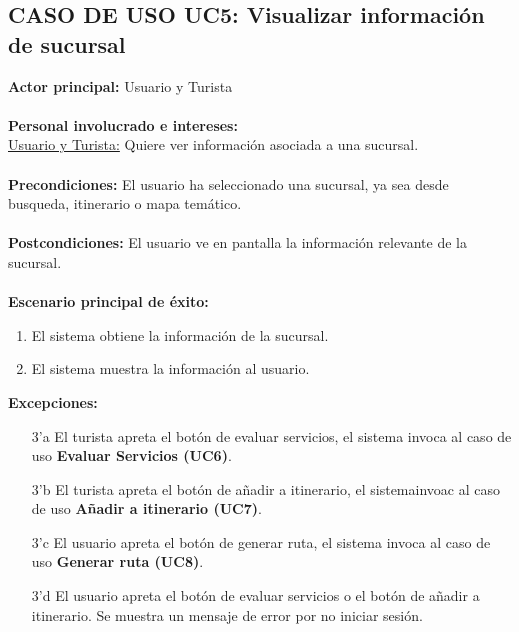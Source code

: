 \documentclass[11pt]{article}
\begin{document}
\subsection*{\textbf{CASO DE USO UC5:} Visualizar información de sucursal }
\textbf{Actor principal:} Usuario y Turista\\
\\
\textbf{Personal involucrado e intereses: }\\\underline{Usuario y Turista:} Quiere ver información asociada a una sucursal.\\
\\
\textbf{Precondiciones:} El usuario ha seleccionado una sucursal, ya sea desde busqueda, itinerario o mapa temático.\\
\\
\textbf{Postcondiciones:} El usuario ve en pantalla la información relevante de la sucursal.\\
\\
\textbf{Escenario principal de éxito:}
\begin{enumerate}
\item El sistema obtiene la información de la sucursal.
\item El sistema muestra la información al usuario.
\end{enumerate}
\textbf{Excepciones:}
\begin{enumerate}
\item[3'a] El turista apreta el botón de evaluar servicios, el sistema invoca al caso de uso \textbf{Evaluar Servicios (UC6)}. 
\item[3'b] El turista apreta el botón de añadir a itinerario, el sistemainvoac al caso de uso \textbf{Añadir a itinerario (UC7)}.
\item[3'c] El usuario apreta el botón de generar ruta, el sistema invoca al caso de uso \textbf{Generar ruta (UC8)}.
\item[3'd] El usuario apreta el botón de evaluar servicios o el botón de añadir a itinerario. Se muestra un mensaje de error por no iniciar sesión.
\end{enumerate}
\end{document}
